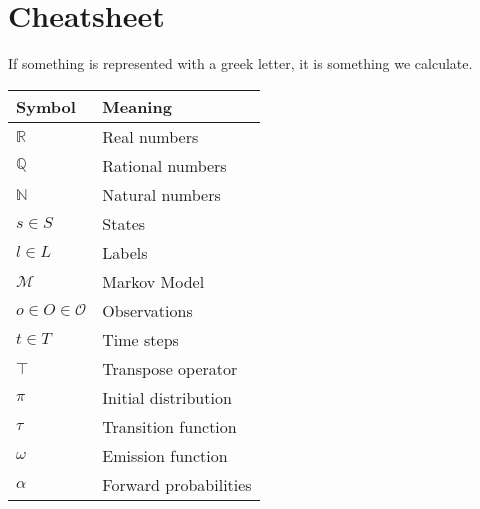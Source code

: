 \section{Cheatsheet}\label{sec:cheatsheet}
If something is represented with a greek letter, it is something we calculate.

\begin{table}[htb!]
    \centering
    \begin{tabular}{ll}
        \toprule
        \textbf{Symbol}                 & \textbf{Meaning}                                \\
        \midrule
        $\mathbb{R}$                    & Real numbers                                    \\
        $\mathbb{Q}$                    & Rational numbers                                \\
        $\mathbb{N}$                    & Natural numbers                                 \\
        $s \in S$                       & States                                          \\
        $l \in L$                       & Labels                                          \\
        $\mathcal{M}$                   & Markov Model                                    \\
        $o \in O \in \mathcal{O}$       & Observations                                    \\
        $t \in T$                       & Time steps                                      \\
        $\top$                          & Transpose operator                              \\
        $\pi$                           & Initial distribution                            \\
        $\tau$                          & Transition function                             \\
        $\omega$                        & Emission function                               \\
        $\alpha$                        & Forward probabilities                           \\

\end{tabular}
\end{table}
